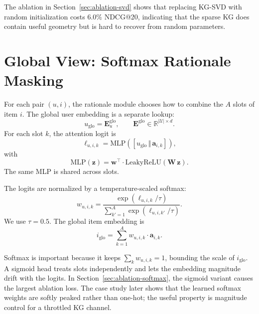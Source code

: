 The ablation in Section~\ref{sec:ablation-svd} shows that replacing KG-SVD with random initialization costs $6.0\%$ NDCG@20, indicating that the sparse KG does contain useful geometry but is hard to recover from random parameters.

\section{Global View: Softmax Rationale Masking}
\label{sec:softmax}

For each pair $(u,i)$, the rationale module chooses how to combine the $A$ slots of item $i$. The global user embedding is a separate lookup:
\begin{equation}
\label{eq:uglo-lookup}
u_{\mathrm{glo}} = \mathbf{E}^{\mathrm{glo}}_u, \qquad \mathbf{E}^{\mathrm{glo}} \in \mathbb{R}^{|\mathcal{U}| \times d}.
\end{equation}
For each slot $k$, the attention logit is
\begin{equation}
\label{eq:logit}
\ell_{u, i, k} = \mathrm{MLP}\!\left( [u_{\mathrm{glo}} \,\Vert\, \mathbf{a}_{i,k}] \right),
\end{equation}
with
\begin{equation}
\label{eq:mlp}
\mathrm{MLP}(\mathbf{z}) = \mathbf{w}^{\top} \cdot \mathrm{LeakyReLU}\!\left(\mathbf{W}\, \mathbf{z}\right).
\end{equation}
The same MLP is shared across slots.

The logits are normalized by a temperature-scaled softmax:
\begin{equation}
\label{eq:softmax-w}
w_{u, i, k} = \frac{\exp(\ell_{u, i, k} / \tau)}{\sum_{k' = 1}^{A} \exp(\ell_{u, i, k'} / \tau)}.
\end{equation}
We use $\tau=0.5$. The global item embedding is
\begin{equation}
\label{eq:iglo}
i_{\mathrm{glo}} = \sum_{k=1}^{A} w_{u, i, k} \cdot \mathbf{a}_{i, k}.
\end{equation}

Softmax is important because it keeps $\sum_k w_{u,i,k}=1$, bounding the scale of $i_{\mathrm{glo}}$. A sigmoid head treats slots independently and lets the embedding magnitude drift with the logits. In Section~\ref{sec:ablation-softmax}, the sigmoid variant causes the largest ablation loss. The case study later shows that the learned softmax weights are softly peaked rather than one-hot; the useful property is magnitude control for a throttled KG channel.

